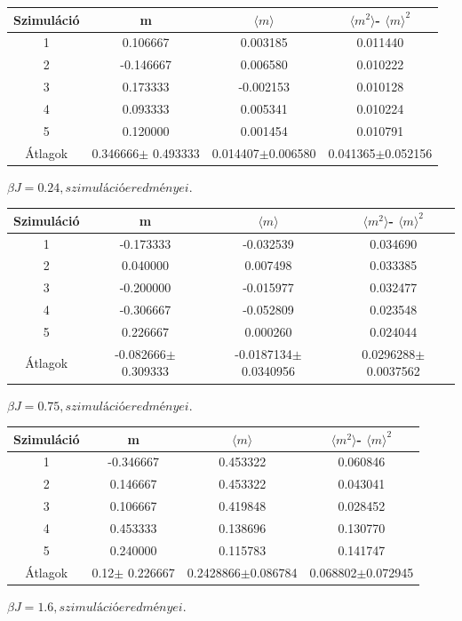 \documentclass[a4paper, 12pt]{article}
\numberwithin{equation}{section}          %
\numberwithin{figure}{subsection}
\begin{document}
\begin{center}
	\begin{tabular}{ ||c|c|c|c|| } 
		\hline
		Szimuláció &  m & $\langle m \rangle$ & $\langle m^2 \rangle$- $\langle m \rangle^2$\\ 
		\hline
		1 & 0.106667  & 0.003185 & 0.011440\\
		2 &  -0.146667 & 0.006580 & 0.010222\\
		3 &  0.173333 & -0.002153 & 0.010128\\
		4 &  0.093333 & 0.005341 & 0.010224\\
		5 &  0.120000 & 0.001454 & 0.010791\\
		\hline
		Átlagok & 0.346666$\pm$ 0.493333 & 0.014407$\pm$0.006580 & 0.041365$\pm$0.052156 \\
		\hline
	\end{tabular}\par
	\bigskip
	$\beta J = 0.24, szimuláció eredményei.$
\end{center}


\begin{center}
	\begin{tabular}{ ||c|c|c|c|| } 
		\hline
		Szimuláció &  m & $\langle m \rangle$ & $\langle m^2 \rangle$- $\langle m \rangle^2$\\ 
		\hline
		1 & -0.173333  & -0.032539 & 0.034690\\
		2 &  0.040000 & 0.007498 & 0.033385\\
		3 &  -0.200000 & -0.015977 & 0.032477\\
		4 &  -0.306667 & -0.052809 & 0.023548\\
		5 &   0.226667 & 0.000260 & 0.024044\\
		\hline
		Átlagok & -0.082666$\pm$ 0.309333 & -0.0187134$\pm$0.0340956 & 0.0296288$\pm$0.0037562\\
		\hline
	\end{tabular}\par
	\bigskip
	$\beta J = 0.75, szimuláció eredményei.$
\end{center}


\begin{center}
	\begin{tabular}{ ||c|c|c|c|| } 
		\hline
		Szimuláció &  m & $\langle m \rangle$ & $\langle m^2 \rangle$- $\langle m \rangle^2$\\ 
		\hline
		1 & -0.346667  & 0.453322 & 0.060846\\
		2 &  0.146667 & 0.453322 & 0.043041\\
		3 &  0.106667 & 0.419848 & 0.028452\\
		4 &  0.453333 & 0.138696 & 0.130770\\
		5 &   0.240000 & 0.115783 & 0.141747\\
		\hline
		Átlagok & 0.12$\pm$ 0.226667 & 0.2428866$\pm$0.086784 & 0.068802$\pm$0.072945\\
		\hline
	\end{tabular}\par
	\bigskip
	$\beta J = 1.6, szimuláció eredményei.$
\end{center}
\end{document}
